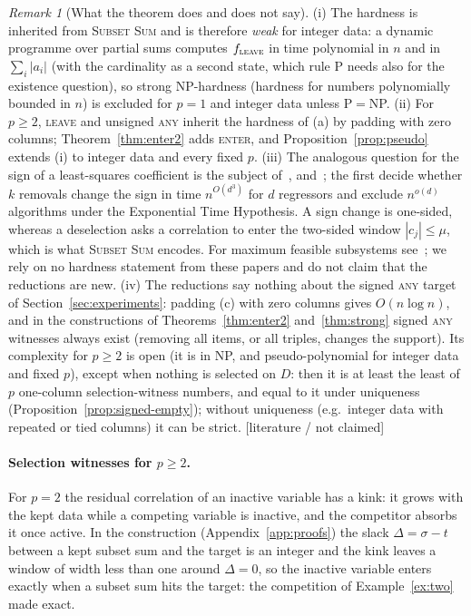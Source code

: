 \documentclass[10pt,a4paper]{article}
\theoremstyle{plain}
\theoremstyle{definition}
\theoremstyle{remark}
\newtheorem{remark}[theorem]{Remark}
\newcommand{\status}[1]{\textnormal{\textsf{\small [#1]}}}
\newcommand{\tsc}[1]{\textnormal{\textsc{#1}}}  %
\begin{document}
\begin{remark}[What the theorem does and does not say]\label{rem:hardness}
(i) The hardness is inherited from \tsc{Subset Sum} and is therefore \emph{weak} for integer data: a dynamic programme over partial sums computes $f_{\tsc{leave}}$ in time polynomial in $n$ and in $\sum_i|a_i|$ (with the cardinality as a second state, which rule P needs also for the existence question), so strong NP-hardness (hardness for numbers polynomially bounded in $n$) is excluded for $p=1$ and integer data unless P${}={}$NP. (ii) For $p\ge2$, \tsc{leave} and unsigned \tsc{any} inherit the hardness of (a) by padding with zero columns; Theorem~\ref{thm:enter2} adds \tsc{enter}, and Proposition~\ref{prop:pseudo} extends (i) to integer data and every fixed $p$. (iii) The analogous question for the sign of a least-squares coefficient is the subject of~\citet{moitra2022}, \citet{freund2023} and~\citet{rubinstein2025}; the first decide whether $k$ removals change the sign in time $n^{O(d^3)}$ for $d$ regressors and exclude $n^{o(d)}$ algorithms under the Exponential Time Hypothesis. A sign change is one-sided, whereas a deselection asks a correlation to enter the two-sided window $|c_j|\le\mu$, which is what \tsc{Subset Sum} encodes. For maximum feasible subsystems see~\citet{amaldi1995,amaldi1998}; we rely on no hardness statement from these papers and do not claim that the reductions are new. (iv) The reductions say nothing about the signed \tsc{any} target of Section~\ref{sec:experiments}: padding (c) with zero columns gives $O(n\log n)$, and in the constructions of Theorems~\ref{thm:enter2} and~\ref{thm:strong} signed \tsc{any} witnesses always exist (removing all items, or all triples, changes the support). Its complexity for $p\ge2$ is open (it is in NP, and pseudo-polynomial for integer data and fixed $p$), except when nothing is selected on $D$: then it is at least the least of $p$ one-column selection-witness numbers, and equal to it under uniqueness (Proposition~\ref{prop:signed-empty}); without uniqueness (e.g.\ integer data with repeated or tied columns) it can be strict. \status{literature / not claimed}
\end{remark}

\paragraph{Selection witnesses for $p\ge2$.} For $p=2$ the residual correlation of an inactive variable has a kink: it grows with the kept data while a competing variable is inactive, and the competitor absorbs it once active. In the construction (Appendix~\ref{app:proofs}) the slack $\Delta=\sigma-t$ between a kept subset sum and the target is an integer and the kink leaves a window of width less than one around $\Delta=0$, so the inactive variable enters exactly when a subset sum hits the target: the competition of Example~\ref{ex:two} made exact.
\end{document}
